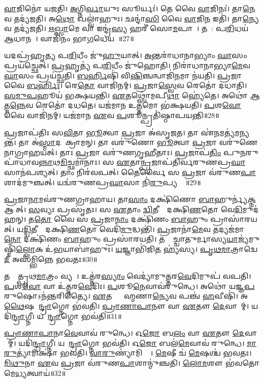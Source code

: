 \ul{𑌵𑌾}𑌜𑌿𑌨𑍋॑ 𑌯𑌜𑌤𑌿।
\ul{𑌅}𑌗𑍍𑌨𑌿\ul{𑌰𑍍𑌵𑌾}𑌯𑍁𑌃 𑌸𑍂𑌰𑍍𑌯𑌃॑।
𑌤𑍇 𑌵𑍈 \ul{𑌵𑌾}𑌜𑌿𑌨𑌃॑।
𑌤𑌾\ul{𑌨𑍇}𑌵 𑌤𑌦𑍍𑌯॑𑌜𑌤𑌿।
𑌅\ul{𑌥𑍋} 𑌖𑌲𑍍𑌵𑌾॑𑌹𑍁𑌃।
𑌛𑌨𑍍𑌦𑌾॑\ul{𑌸𑌿} 𑌵𑍈 \ul{𑌵𑌾}𑌜𑌿\ul{𑌨} 𑌇𑌤𑌿॑।
𑌤𑌾\ul{𑌨𑍍𑌯𑍇}𑌵 𑌤𑌦𑍍𑌯॑𑌜𑌤𑌿।
\ul{𑌋}\ul{𑌖𑍍𑌸𑌾}𑌮𑍇 𑌵𑌾 𑌇𑌨𑍍𑌦𑍍𑌰॑\ul{𑌸𑍍𑌯} 𑌹𑌰𑍀॑ 𑌸𑍋\ul{𑌮}𑌪𑌾𑌨𑍗᳚।
𑌤𑌯𑍋᳚: 𑌪\ul{𑌰𑌿}𑌧𑌯॑ \ul{𑌆}𑌧𑌾𑌨𑌮𑍍᳚।
𑌵𑌾𑌜𑌿॑𑌨𑌂 𑌭𑌾\ul{𑌗}𑌧𑍇𑌯𑌮𑍍᳚॥27॥

𑌯𑌦𑌪𑍍𑌰॑𑌹𑍃𑌤𑍍𑌯 𑌪\ul{𑌰𑌿}𑌧𑍀𑌂 𑌜𑍁॑\ul{𑌹𑍁}𑌯𑌾𑌤𑍍।
\ul{𑌅}𑌨𑍍𑌤𑌰𑌾॑𑌧𑌾𑌨𑌾𑌭𑍍𑌯𑌾𑌂 \ul{𑌘𑌾}𑌸𑌂 𑌪𑍍𑌰𑌯॑𑌚𑍍𑌛𑍇𑌤𑍍।
\ul{𑌪𑍍𑌰}𑌹𑍃𑌤𑍍𑌯॑ 𑌪\ul{𑌰𑌿}𑌧𑍀𑌂 𑌜𑍁॑𑌹𑍋𑌤𑌿।
𑌨𑌿𑌰𑌾॑𑌧𑌾𑌨𑌾𑌭𑍍𑌯𑌾\ul{𑌮𑍇}𑌵 \ul{𑌘𑌾}𑌸𑌂 𑌪𑍍𑌰𑌯॑𑌚𑍍𑌛𑌤𑌿।
\ul{𑌬}\ul{𑌰𑍍}𑌹𑌿𑌷𑌿॑ 𑌵𑌿\ul{𑌷𑌿}𑌞𑍍𑌚𑌨𑍍𑌵𑌾𑌜𑌿॑\ul{𑌨}𑌮𑌾 𑌨॑𑌯𑌤𑌿।
\ul{𑌪𑍍𑌰}𑌜𑌾 𑌵𑍈 \ul{𑌬}\ul{𑌰𑍍}𑌹𑌿𑌃।
𑌰𑍇\ul{𑌤𑍋} 𑌵𑌾𑌜𑌿॑𑌨𑌮𑍍।
\ul{𑌪𑍍𑌰}𑌜𑌾\ul{𑌸𑍍𑌵𑍇}𑌵 𑌰𑍇𑌤𑍋॑ 𑌦𑌧𑌾𑌤𑌿।
\ul{𑌸}\ul{𑌮𑍁}\ul{𑌪}𑌹𑍂𑌯॑ 𑌭𑌕𑍍𑌷𑌯𑌨𑍍𑌤𑌿।
\ul{𑌏}𑌤𑌥𑍍𑌸𑍋॑𑌮𑌪𑍀\ul{𑌥𑌾} 𑌹𑍍𑌯𑍇॑𑌤𑍇।
𑌅𑌥𑍋॑ \ul{𑌆}𑌤𑍍𑌮\ul{𑌨𑍍𑌨𑍇}𑌵 𑌰𑍇𑌤𑍋॑ 𑌦𑌧𑌤𑍇।
𑌯𑌜॑𑌮𑌾𑌨 𑌉\ul{𑌤𑍍𑌤}𑌮𑍋 𑌭॑𑌕𑍍𑌷𑌯𑌤𑌿।
\ul{𑌪}𑌶\ul{𑌵𑍋} 𑌵𑍈 𑌵𑌾𑌜𑌿॑𑌨𑌮𑍍।
𑌯𑌜॑𑌮𑌾𑌨 \ul{𑌏}𑌵 \ul{𑌪}𑌶𑍂𑌨𑍍𑌪𑍍𑌰𑌤𑌿॑\-𑌷𑍍𑌠𑌾𑌪𑌯𑌨𑍍𑌤𑌿॥28॥\anuvakamend[\ul{𑌲𑍋}𑌕𑍋 𑌬॑𑌹𑍁\ul{𑌰𑍂}𑌪𑌂 𑌭॑\ul{𑌵}𑌤𑍍𑌯𑌾𑌜𑍍𑌯॑𑌭𑌾𑌗𑍗 \ul{𑌪}𑌶\ul{𑌵} 𑌆𑌜𑍍𑌯॑𑌮\ul{𑌵}𑌦𑍍𑌯𑍇𑌦𑌾॑𑌹\ul{𑌵}𑌨𑍀𑌯𑌃॑ \ul{𑌪𑍍𑌰}𑌤𑍍𑌯𑌕𑍍𑌤\ul{𑌸𑍍𑌮𑌾}𑌤𑍍𑌪𑍍𑌰𑌤𑌿॑\-𑌷𑍍𑌠𑌿𑌤𑍋 𑌹𑍋\ul{𑌤}𑌵𑍍𑌯𑍋॑ 𑌭𑌾\ul{𑌗}𑌧𑍇𑌯॑\ul{𑌮𑍇}𑌤𑍇 \ul{𑌚}𑌤𑍍𑌵𑌾𑌰𑌿॑ 𑌚]

\ul{𑌪𑍍𑌰}𑌜𑌾𑌪॑𑌤𑌿𑌃 𑌸\ul{𑌵𑌿}𑌤𑌾 \ul{𑌭𑍂}𑌤𑍍𑌵𑌾 \ul{𑌪𑍍𑌰}𑌜𑌾 𑌅॑𑌸𑍃𑌜𑌤।
𑌤𑌾 𑌏॑\ul{𑌨}𑌮𑌤𑍍𑌯॑𑌮𑌨𑍍𑌯𑌨𑍍𑌤।
𑌤𑌾 𑌅॑\ul{𑌸𑍍𑌮𑌾}𑌦𑌪𑌾᳚𑌕𑍍𑌰𑌾𑌮𑌨𑍍।
𑌤𑌾 𑌵𑌰𑍁॑𑌣𑍋 \ul{𑌭𑍂}𑌤𑍍𑌵𑌾 \ul{𑌪𑍍𑌰}𑌜𑌾 𑌵𑌰𑍁॑𑌣𑍇𑌨𑌾𑌗𑍍𑌰𑌾𑌹𑌯𑌤𑍍।
𑌤𑌾𑌃 \ul{𑌪𑍍𑌰}𑌜𑌾 𑌵𑌰𑍁॑𑌣𑌗𑍃𑌹𑍀𑌤𑌾𑌃।
\ul{𑌪𑍍𑌰}𑌜𑌾𑌪॑\ul{𑌤𑌿𑌂} 𑌪𑍁\ul{𑌨}𑌰𑍁𑌪𑌾॑𑌧𑌾𑌵\ul{𑌨𑍍𑌨𑌾}𑌥\ul{𑌮𑌿}𑌚𑍍𑌛𑌮𑌾॑𑌨𑌾𑌃।
𑌸 \ul{𑌏}𑌤𑌾\ul{𑌨𑍍𑌪𑍍𑌰}𑌜𑌾𑌪॑𑌤𑌿𑌰𑍍𑌵𑌰𑍁𑌣\-𑌪𑍍𑌰\ul{𑌘𑌾}𑌸𑌾𑌨॑𑌪𑌶𑍍𑌯𑌤𑍍।
𑌤𑌾𑌂 𑌨𑌿𑌰॑𑌵𑌪𑌤𑍍।
𑌤𑍈𑌰𑍍𑌵𑍈 𑌸 \ul{𑌪𑍍𑌰}𑌜𑌾 𑌵॑𑌰𑍁𑌣\ul{𑌪𑌾}𑌶𑌾𑌦॑𑌮𑍁𑌞𑍍𑌚𑌤𑍍।
𑌯𑌦𑍍𑌵॑𑌰𑍁𑌣𑌪𑍍𑌰\ul{𑌘𑌾}𑌸𑌾 𑌨𑌿॑\ul{𑌰𑍁}𑌪𑍍𑌯𑌨𑍍𑌤𑍇᳚॥29॥

\ul{𑌪𑍍𑌰}𑌜𑌾\ul{𑌨𑌾}𑌮𑌵॑𑌰𑍁𑌣𑌗𑍍𑌰𑌾𑌹𑌾𑌯।
𑌤𑌾\ul{𑌸𑌾𑌂} 𑌦𑌕𑍍𑌷𑌿॑𑌣𑍋 \ul{𑌬𑌾}𑌹𑍁𑌰𑍍𑌨𑍍𑌯॑\ul{𑌕𑍍𑌨} 𑌆𑌸𑍀᳚𑌤𑍍।
\ul{𑌸}𑌵𑍍𑌯𑌃 𑌪𑍍𑌰𑌸𑍃॑𑌤𑌃।
𑌸 \ul{𑌏}𑌤𑌾𑌂 \ul{𑌦𑍍𑌵𑌿}𑌤𑍀𑌯𑌾𑌂᳚ 𑌦𑌕𑍍𑌷𑌿\ul{𑌣}𑌤𑍋 𑌵𑍇\ul{𑌦𑌿}𑌮𑍁𑌦॑𑌹𑌨𑍍।
𑌤\ul{𑌤𑍋} 𑌵𑍈 𑌸 \ul{𑌪𑍍𑌰}𑌜𑌾\ul{𑌨𑌾𑌂} 𑌦𑌕𑍍𑌷𑌿॑𑌣𑌂 \ul{𑌬𑌾}𑌹𑍁𑌂 𑌪𑍍𑌰𑌾𑌸𑌾॑𑌰𑌯𑌤𑍍।
𑌯\ul{𑌦𑍍𑌦𑍍𑌵𑌿}𑌤𑍀𑌯𑌾𑌂᳚ 𑌦𑌕𑍍𑌷𑌿\ul{𑌣}𑌤𑍋 𑌵𑍇𑌦𑌿॑\ul{𑌮𑍁}𑌦𑍍𑌧𑌨𑍍𑌤𑌿॑।
\ul{𑌪𑍍𑌰}𑌜𑌾𑌨𑌾॑\ul{𑌮𑍇}𑌵 𑌤𑌦𑍍𑌯𑌜॑𑌮𑌾\ul{𑌨𑍋} 𑌦𑌕𑍍𑌷𑌿॑𑌣𑌂 \ul{𑌬𑌾}𑌹𑍁𑌂 𑌪𑍍𑌰𑌸𑌾॑𑌰𑌯𑌤𑌿।
𑌤𑌸𑍍𑌮𑌾᳚𑌚𑍍𑌚𑌾𑌤𑍁𑌰𑍍𑌮𑌾𑌸𑍍𑌯\ul{𑌯𑌾}𑌜𑍍𑌯॑𑌮𑍁𑌷𑍍𑌮𑌿𑌁॑\ul{𑌲𑍍𑌲𑍋}𑌕 𑌉॑\ul{𑌭}𑌯𑌾𑌬𑌾॑𑌹𑍁𑌃।
\ul{𑌯}𑌜𑍍𑌞𑌾𑌭𑌿॑𑌜𑌿\ul{𑌤}\ul{} 𑌹𑍍𑌯॑𑌸𑍍𑌯।
\ul{𑌪𑍃}\ul{𑌥}\ul{𑌮𑌾}𑌤𑍍𑌰𑌾𑌦𑍍𑌵𑍇\ul{𑌦𑍀} 𑌅𑌸॑𑌮𑍍𑌭𑌿𑌨𑍍𑌨𑍇 𑌭𑌵𑌤𑌃॥30॥

𑌤𑌸𑍍𑌮𑌾᳚𑌤𑍍𑌪𑍃𑌥\ul{𑌮𑌾}𑌤𑍍𑌰𑌂 𑌵𑍍𑌯𑌸𑍗᳚।
𑌉𑌤𑍍𑌤॑𑌰\ul{𑌸𑍍𑌯𑌾𑌂} 𑌵𑍇𑌦𑍍𑌯𑌾॑𑌮𑍁𑌤𑍍𑌤𑌰\ul{𑌵𑍇}𑌦𑌿𑌮𑍁𑌪॑ 𑌵𑌪𑌤𑌿।
\ul{𑌪}𑌶\ul{𑌵𑍋} 𑌵𑌾 𑌉॑𑌤𑍍𑌤𑌰\ul{𑌵𑍇}𑌦𑌿𑌃।
\ul{𑌪}𑌶𑍂\ul{𑌨𑍇}𑌵𑌾𑌵॑𑌰𑍁𑌨𑍍𑌧𑍇।
𑌅𑌥𑍋॑ 𑌯𑌜𑍍𑌞\ul{𑌪}𑌰𑍁𑌷𑍋\-𑌽𑌨॑𑌨𑍍𑌤𑌰𑌿𑌤𑍍𑌯𑍈।
\ul{𑌏}𑌤𑌦𑍍𑌬𑍍𑌰𑌾᳚𑌹𑍍𑌮𑌣𑌾\ul{𑌨𑍍𑌯𑍇}𑌵 𑌪𑌞𑍍𑌚॑ \ul{𑌹}𑌵𑍀𑌷𑌿॑।
𑌅\ul{𑌥𑍈}𑌷 𑌐᳚\ul{𑌨𑍍𑌦𑍍𑌰𑌾}𑌗𑍍𑌨𑍋 𑌭॑𑌵𑌤𑌿।
\ul{𑌪𑍍𑌰𑌾}\ul{𑌣𑌾}\ul{𑌪𑌾}𑌨𑍗 𑌵𑌾 \ul{𑌏}𑌤𑍗 \ul{𑌦𑍇}𑌵𑌾𑌨𑌾᳚𑌮𑍍।
𑌯𑌦𑌿॑\ul{𑌨𑍍𑌦𑍍𑌰𑌾}𑌗𑍍𑌨𑍀।
𑌯𑌦𑍈᳚\ul{𑌨𑍍𑌦𑍍𑌰𑌾}𑌗𑍍𑌨𑍋 𑌭𑌵॑𑌤𑌿॥31॥

\ul{𑌪𑍍𑌰𑌾}\ul{𑌣𑌾}\ul{𑌪𑌾}𑌨𑌾\ul{𑌵𑍇}𑌵𑌾𑌵॑ 𑌰𑍁𑌨𑍍𑌧𑍇।
𑌓\ul{𑌜𑍋} 𑌬\ul{𑌲𑌂} 𑌵𑌾 \ul{𑌏}𑌤𑍗 \ul{𑌦𑍇}𑌵𑌾𑌨𑌾᳚𑌮𑍍।
𑌯𑌦𑌿॑\ul{𑌨𑍍𑌦𑍍𑌰𑌾}𑌗𑍍𑌨𑍀।
𑌯𑌦𑍈᳚\ul{𑌨𑍍𑌦𑍍𑌰𑌾}𑌗𑍍𑌨𑍋 𑌭𑌵॑𑌤𑌿।
𑌓\ul{𑌜𑍋} 𑌬𑌲॑\ul{𑌮𑍇}𑌵𑌾𑌵॑ 𑌰𑍁𑌨𑍍𑌧𑍇।
\ul{𑌮𑌾}\ul{𑌰𑍁}𑌤𑍍𑌯𑌾॑𑌮𑌿𑌕𑍍𑌷𑌾॑ 𑌭𑌵𑌤𑌿।
\ul{𑌵𑌾}\ul{𑌰𑍁}𑌣𑍍𑌯𑌾॑𑌮𑌿𑌕𑍍𑌷𑌾᳚।
\ul{𑌮𑍇}𑌷𑍀 𑌚॑ \ul{𑌮𑍇}𑌷𑌶𑍍𑌚॑ 𑌭𑌵𑌤𑌃।
\ul{𑌮𑌿}\ul{𑌥𑍁}𑌨𑌾 \ul{𑌏}𑌵 \ul{𑌪𑍍𑌰}𑌜𑌾 𑌵॑𑌰𑍁𑌣\ul{𑌪𑌾}𑌶𑌾𑌨𑍍𑌮𑍁॑𑌞𑍍𑌚𑌤𑌿।
\ul{𑌲𑍋}\ul{𑌮}𑌶𑍗 𑌭॑𑌵𑌤𑍋 𑌮𑍇\ul{𑌧𑍍𑌯}𑌤𑍍𑌵𑌾𑌯॑॥32॥


